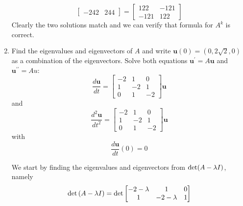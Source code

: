 \begin{enumerate}[label=\arabic*.]
\begin{mdframed}[style=MyFrame]
\begin{equation}
\begin{bmatrix}
                    -242    &       244
                \end{bmatrix}
                =
                \begin{bmatrix}
                    122         &       -121        \\
                    -121        &       122
                \end{bmatrix}
            \end{equation}
            Clearly the two solutions match and we can verify that formula
            for $A^{k}$ is correct.
        \end{mdframed}

    \item Find the eigenvalues and eigenvectors of $A$ and write
        $\mathbf{u}(0)=(0, 2\sqrt{2}, 0)$ as a combination of the
        eigenvectors. Solve both equations $\mathbf{u}^{\prime} = A
        \mathbf{u}$ and $\mathbf{u}^{\prime \prime} = A u$:
    \begin{equation}
        \frac{d\mathbf{u}}{dt} = 
        \begin{bmatrix}
            -2 & 1 & 0 \\
            1 & -2 & 1 \\
            0 &1 & -2
        \end{bmatrix}
        \mathbf{u}
    \end{equation}
    and 
    \begin{equation}
        \frac{d^{2}\mathbf{u}}{dt^{2}} = 
        \begin{bmatrix}
            -2 & 1 & 0 \\
            1 & -2 & 1 \\
            0 &1 & -2
        \end{bmatrix}
        \mathbf{u}
    \end{equation}
    with
    \begin{equation}
        \frac{d\mathbf{u}}{dt}(0) = 0
    \end{equation}
    \begin{mdframed}[style=MyFrame]
        We start by finding the eigenvalues and eigenvectors from
        $\text{det}(A-\lambda I)$, namely
        \begin{equation}
            \text{det}\left(A-\lambda I\right) =
            \text{det}
            \begin{bmatrix}
                -2-\lambda      &   1           &   0           \\
                1               &   -2-\lambda  &   1           \\

\end{bmatrix}
\end{equation}
\end{mdframed}
\end{enumerate}
